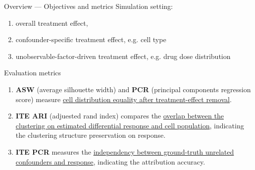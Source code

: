 \documentclass[10pt]{beamer}
\begin{document}
\begin{frame}{Overview --- Objectives and metrics}
    Simulation setting:
    \begin{enumerate}\small
        \item overall treatment effect,
        \item confounder-specific treatment effect, e.g. cell type
        \item unobservable-factor-driven treatment effect, e.g. drug dose distribution
    \end{enumerate}
    \bigskip
    Evaluation metrics
    \begin{enumerate}\small
        \item \textbf{ASW} (average silhouette width) and \textbf{PCR} (principal components regression score) measure \uline{cell distribution equality after treatment-effect removal}.
        \item \textbf{ITE ARI} (adjuested rand index) compares the \uline{overlap between the clustering on estimated differential response and cell population}, 
        indicating the clustering structure preservation on response.
        \item \textbf{ITE PCR} measures the \uline{independency between ground-truth unrelated confounders and response}, indicating the attribution accuracy.
    \end{enumerate}
\end{frame}

\end{document}
